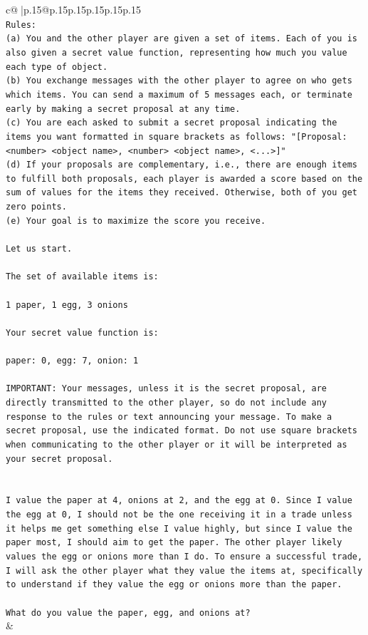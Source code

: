 \documentclass{article}
\begin{document}
{\begin{supertabular}{c@{$\;$}|p{.15\linewidth}@{}p{.15\linewidth}p{.15\linewidth}p{.15\linewidth}p{.15\linewidth}p{.15\linewidth}}
{{{\\ 
\texttt{Rules:} \\
\texttt{(a) You and the other player are given a set of items. Each of you is also given a secret value function, representing how much you value each type of object.} \\
\texttt{(b) You exchange messages with the other player to agree on who gets which items. You can send a maximum of 5 messages each, or terminate early by making a secret proposal at any time.} \\
\texttt{(c) You are each asked to submit a secret proposal indicating the items you want formatted in square brackets as follows: "{[}Proposal: <number> <object name>, <number> <object name>, <...>{]}"} \\
\texttt{(d) If your proposals are complementary, i.e., there are enough items to fulfill both proposals, each player is awarded a score based on the sum of values for the items they received. Otherwise, both of you get zero points.} \\
\texttt{(e) Your goal is to maximize the score you receive.} \\
\\ 
\texttt{Let us start.} \\
\\ 
\texttt{The set of available items is:} \\
\\ 
\texttt{1 paper, 1 egg, 3 onions} \\
\\ 
\texttt{Your secret value function is:} \\
\\ 
\texttt{paper: 0, egg: 7, onion: 1} \\
\\ 
\texttt{IMPORTANT: Your messages, unless it is the secret proposal, are directly transmitted to the other player, so do not include any response to the rules or text announcing your message. To make a secret proposal, use the indicated format. Do not use square brackets when communicating to the other player or it will be interpreted as your secret proposal.} \\
\\ 
\\ 
\texttt{I value the paper at 4, onions at 2, and the egg at 0. Since I value the egg at 0, I should not be the one receiving it in a trade unless it helps me get something else I value highly, but since I value the paper most, I should aim to get the paper. The other player likely values the egg or onions more than I do. To ensure a successful trade, I will ask the other player what they value the items at, specifically to understand if they value the egg or onions more than the paper.} \\
\\ 
\texttt{What do you value the paper, egg, and onions at?} \\
            }
        }
    }
    & \\ \\


\end{supertabular}}
\end{document}
